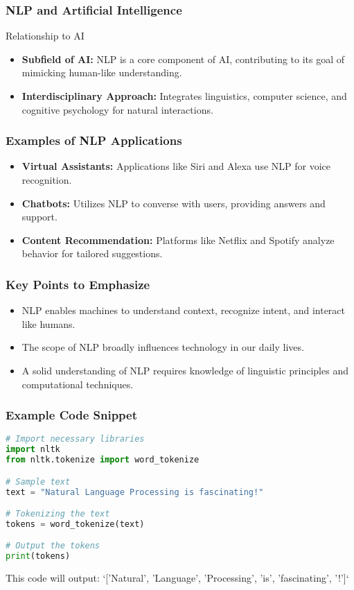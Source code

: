 \documentclass[aspectratio=169]{beamer}
\begin{document}
\begin{frame}[fragile]
    \frametitle{NLP and Artificial Intelligence}
    \begin{block}{Relationship to AI}
        \begin{itemize}
            \item \textbf{Subfield of AI:} NLP is a core component of AI, contributing to its goal of mimicking human-like understanding.
            \item \textbf{Interdisciplinary Approach:} Integrates linguistics, computer science, and cognitive psychology for natural interactions.
        \end{itemize}
    \end{block}
\end{frame}

\begin{frame}[fragile]
    \frametitle{Examples of NLP Applications}
    \begin{itemize}
        \item \textbf{Virtual Assistants:} Applications like Siri and Alexa use NLP for voice recognition.
        \item \textbf{Chatbots:} Utilizes NLP to converse with users, providing answers and support.
        \item \textbf{Content Recommendation:} Platforms like Netflix and Spotify analyze behavior for tailored suggestions.
    \end{itemize}
\end{frame}

\begin{frame}[fragile]
    \frametitle{Key Points to Emphasize}
    \begin{itemize}
        \item NLP enables machines to understand context, recognize intent, and interact like humans.
        \item The scope of NLP broadly influences technology in our daily lives.
        \item A solid understanding of NLP requires knowledge of linguistic principles and computational techniques.
    \end{itemize}
\end{frame}

\begin{frame}[fragile]
    \frametitle{Example Code Snippet}
    \begin{lstlisting}[language=Python]
# Import necessary libraries
import nltk
from nltk.tokenize import word_tokenize

# Sample text
text = "Natural Language Processing is fascinating!"

# Tokenizing the text
tokens = word_tokenize(text)

# Output the tokens
print(tokens)
    \end{lstlisting}
    This code will output: `['Natural', 'Language', 'Processing', 'is', 'fascinating', '!']`
\end{frame}
\end{document}

